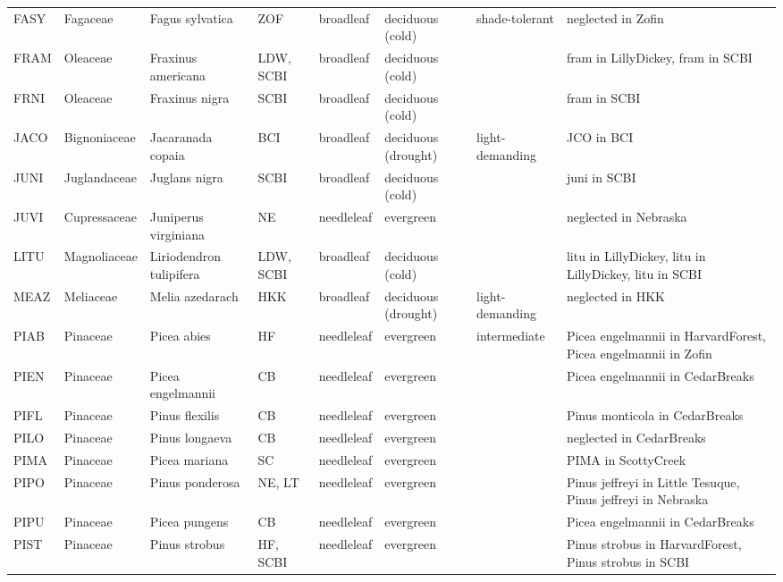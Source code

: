 \documentclass[
]{article}
\begin{document}
\begin{table}[!h]
{\begin{tabular}{lllllll>{\raggedright\arraybackslash}p{5cm}}
\addlinespace
FASY & Fagaceae & Fagus sylvatica & ZOF & broadleaf & deciduous (cold) & shade-tolerant & neglected in Zofin\\
\addlinespace
FRAM & Oleaceae & Fraxinus americana & LDW, SCBI & broadleaf & deciduous (cold) &  & fram in LillyDickey, fram in SCBI\\
\addlinespace
FRNI & Oleaceae & Fraxinus nigra & SCBI & broadleaf & deciduous (cold) &  & fram in SCBI\\
\addlinespace
JACO & Bignoniaceae & Jacaranada copaia & BCI & broadleaf & deciduous (drought) & light-demanding & JCO in BCI\\
\addlinespace
JUNI & Juglandaceae & Juglans nigra & SCBI & broadleaf & deciduous (cold) &  & juni in SCBI\\
\addlinespace
JUVI & Cupressaceae & Juniperus virginiana & NE & needleleaf & evergreen &  & neglected in Nebraska\\
\addlinespace
LITU & Magnoliaceae & Liriodendron tulipifera & LDW, SCBI & broadleaf & deciduous (cold) &  & litu in LillyDickey, litu in LillyDickey, litu in SCBI\\
\addlinespace
MEAZ & Meliaceae & Melia azedarach & HKK & broadleaf & deciduous (drought) & light-demanding & neglected in HKK\\
\addlinespace
PIAB & Pinaceae & Picea abies & HF & needleleaf & evergreen & intermediate & Picea engelmannii in HarvardForest, Picea engelmannii in Zofin\\
\addlinespace
PIEN & Pinaceae & Picea engelmannii & CB & needleleaf & evergreen &  & Picea engelmannii in CedarBreaks\\
\addlinespace
PIFL & Pinaceae & Pinus flexilis & CB & needleleaf & evergreen &  & Pinus monticola in CedarBreaks\\
\addlinespace
PILO & Pinaceae & Pinus longaeva & CB & needleleaf & evergreen &  & neglected in CedarBreaks\\
\addlinespace
PIMA & Pinaceae & Picea mariana & SC & needleleaf & evergreen &  & PIMA in ScottyCreek\\
\addlinespace
PIPO & Pinaceae & Pinus ponderosa & NE, LT & needleleaf & evergreen &  & Pinus jeffreyi in Little Tesuque, Pinus jeffreyi in Nebraska\\
\addlinespace
PIPU & Pinaceae & Picea pungens & CB & needleleaf & evergreen &  & Picea engelmannii in CedarBreaks\\
\addlinespace
PIST & Pinaceae & Pinus strobus & HF, SCBI & needleleaf & evergreen &  & Pinus strobus in HarvardForest, Pinus strobus in SCBI\\

\end{tabular}}
\end{table}
\end{document}
